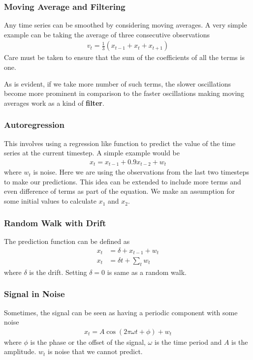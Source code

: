 \documentclass[../main.tex]{subfiles}
\begin{document}
    \subsubsection{Moving Average and Filtering}
    Any time series can be smoothed by considering moving averages. A very simple example can be taking the average of three consecutive observations
    \begin{align*}
        v_{t} = \frac{1}{3}(x_{t-1} + x_{t} + x_{t+1})
    \end{align*}
    Care must be taken to ensure that the sum of the coefficients of all the terms is one.\newline

    As is evident, if we take more number of such terms, the slower oscillations become more prominent in comparison to the faster oscillations making moving averages work as a kind of \textbf{filter}.

    \subsubsection{Autoregression}
    This involves using a regression like function to predict the value of the time series at the current timestep. A simple example would be
    \begin{align*}
        x_{t} = x_{t-1} + 0.9x_{t-2} + w_{t}
    \end{align*}
    where $w_{t}$ is noise. Here we are using the observations from the last two timesteps to make our predictions. This idea can be extended to include more terms and even difference of terms as part of the equation. We make an assumption for some initial values to calculate $x_{1}$ and $x_{2}$.

    \subsubsection{Random Walk with Drift}
    The prediction function can be defined as
    \begin{align*}
        x_{t} &= \delta + x_{t-1} + w_{t}\\
        x_{t} &= \delta t + \sum_{t} w_{t}
    \end{align*}
    where $\delta$ is the drift. Setting $\delta = 0$ is same as a random walk.

    \subsubsection{Signal in Noise}
    Sometimes, the signal can be seen as having a periodic component with some noise
    \begin{align*}
        x_{t} = A\cos (2\pi \omega t + \phi) + w_{t}
    \end{align*}
    where $\phi$ is the phase or the offset of the signal, $\omega$ is the time period and $A$ is the amplitude. $w_{t}$ is noise that we cannot predict.\newline
\end{document}
